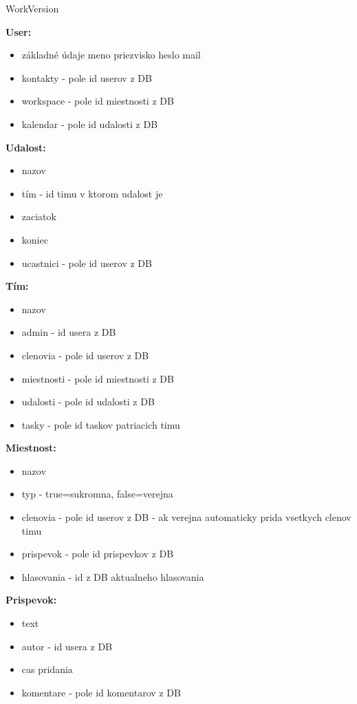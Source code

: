 WorkVersion

\textbf{User:}
\indent\begin{itemize}
    \item základné údaje meno priezvisko heslo mail
    \item kontakty - pole id userov z DB
    \item workspace - pole id miestnosti z DB
    \item kalendar - pole id udalosti z DB
\end{itemize}

\textbf{Udalost:}
\indent\begin{itemize}
    \item nazov
    \item tím - id timu v ktorom udalost je
    \item zaciatok
    \item koniec
    \item ucastnici - pole id userov z DB
\end{itemize}

\textbf{Tím:}
\indent\begin{itemize}
    \item nazov
    \item admin - id usera z DB
    \item clenovia - pole id userov z DB 
    \item miestnosti - pole id miestnosti z DB
    \item udalosti - pole id udalosti z DB 
    \item tasky - pole id taskov patriacich timu
\end{itemize}

\textbf{Miestnost:}
\indent\begin{itemize}
    \item nazov
    \item typ - true=sukromna, false=verejna
    \item clenovia - pole id userov z DB - ak verejna automaticky prida vsetkych clenov timu
    \item prispevok - pole id prispevkov z DB
    \item hlasovania - id z DB aktualneho hlasovania
\end{itemize}

\textbf{Prispevok:}
\indent\begin{itemize}
    \item text
    \item autor - id usera z DB
    \item cas pridania
    \item komentare - pole id komentarov z DB
\end{itemize}

